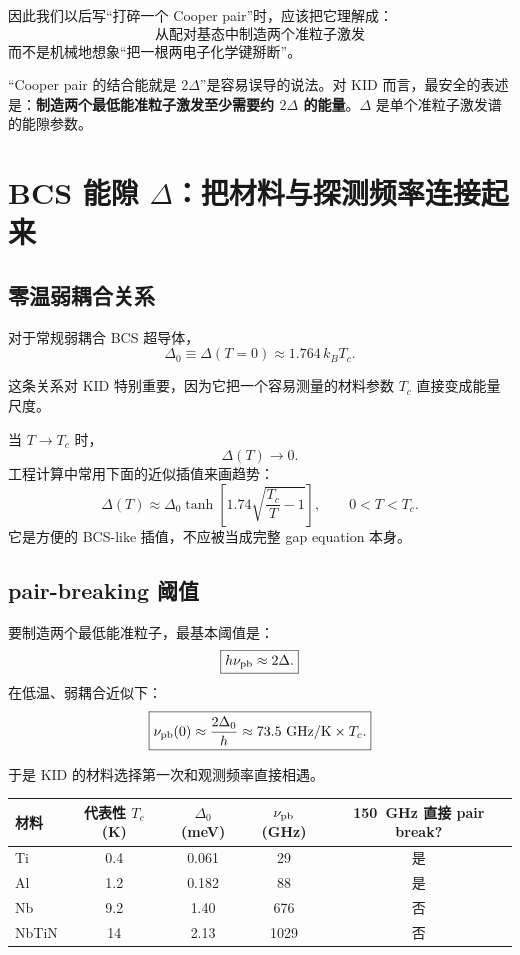 \documentclass[11pt,a4paper,openany]{ctexrep}
\begin{document}
因此我们以后写“打碎一个 Cooper pair”时，应该把它理解成：
\[
\boxed{\text{从配对基态中制造两个准粒子激发}}
\]
而不是机械地想象“把一根两电子化学键掰断”。

\begin{mistakebox}
“Cooper pair 的结合能就是 $2\Delta$”是容易误导的说法。对 KID 而言，最安全的表述是：\textbf{制造两个最低能准粒子激发至少需要约 $2\Delta$ 的能量}。$\Delta$ 是单个准粒子激发谱的能隙参数。
\end{mistakebox}

\section{BCS 能隙 $\Delta$：把材料与探测频率连接起来}

\subsection{零温弱耦合关系}
对于常规弱耦合 BCS 超导体，
\[
\boxed{\Delta_0\equiv\Delta(T=0)\approx1.764\,k_B T_c.}
\]

这条关系对 KID 特别重要，因为它把一个容易测量的材料参数 $T_c$ 直接变成能量尺度。

当 $T\rightarrow T_c$ 时，
\[
\Delta(T)\rightarrow0.
\]
工程计算中常用下面的近似插值来画趋势：
\[
\Delta(T)\approx
\Delta_0\tanh\!\left[
1.74\sqrt{\frac{T_c}{T}-1}
\right],\qquad 0<T<T_c.
\]
它是方便的 BCS-like 插值，不应被当成完整 gap equation 本身。

\subsection{pair-breaking 阈值}
要制造两个最低能准粒子，最基本阈值是：
\[
\boxed{h\nu_{\rm pb}\approx2\Delta.}
\]
在低温、弱耦合近似下：
\[
\boxed{
\nu_{\rm pb}(0)
\approx
\frac{2\Delta_0}{h}
\approx
73.5\ \mathrm{GHz/K}\times T_c.
}
\]

于是 KID 的材料选择第一次和观测频率直接相遇。

\begin{center}
\renewcommand{\arraystretch}{1.2}
\begin{tabular}{lcccc}
\toprule
材料 & 代表性 $T_c$ (K) & $\Delta_0$ (meV) & $\nu_{\rm pb}$ (GHz) & \SI{150}{GHz} 直接 pair break?\\
\midrule
Ti & 0.4 & 0.061 & 29 & 是 \\
Al & 1.2 & 0.182 & 88 & 是 \\
Nb & 9.2 & 1.40 & 676 & 否 \\
NbTiN & 14 & 2.13 & 1029 & 否 \\
\bottomrule
\end{tabular}
\end{center}
\end{document}
